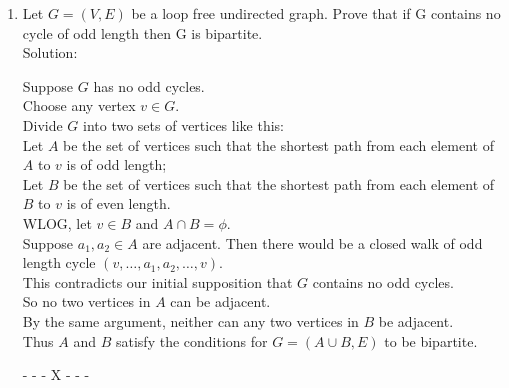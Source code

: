 \documentclass{article}
\begin{document}
\begin{enumerate}
    \item Let $G = (V, E)$ be a loop free undirected graph. Prove that if G contains no cycle of odd
length then G is bipartite.\\
Solution: 

Suppose $G$ has no odd cycles.\\
Choose any vertex $v \in G$.\\

Divide $G$ into two sets of vertices like this:\\
Let $A$ be the set of vertices such that the shortest path from each element of $A$ to $v$ is of odd length;\\
Let $B$ be the set of vertices such that the shortest path from each element of $B$ to $v$ is of even length. \\
WLOG, let $v \in B$ and $A\cap B=\phi$.\\

Suppose $a_1,a_2 \in A$ are adjacent. Then there would be a closed walk of odd length cycle $(v,\dots,a_1,a_2,\dots,v)$.\\
This contradicts our initial supposition that $G$ contains no odd cycles.\\
So no two vertices in $A$ can be adjacent.\\
By the same argument, neither can any two vertices in $B$ be adjacent.\\
Thus $A$ and $B$ satisfy the conditions for $G=(A \cup B,E)$ to be bipartite. 
\begin{center}
- - - X - - -
\end{center}

\end{enumerate}
\end{document}
